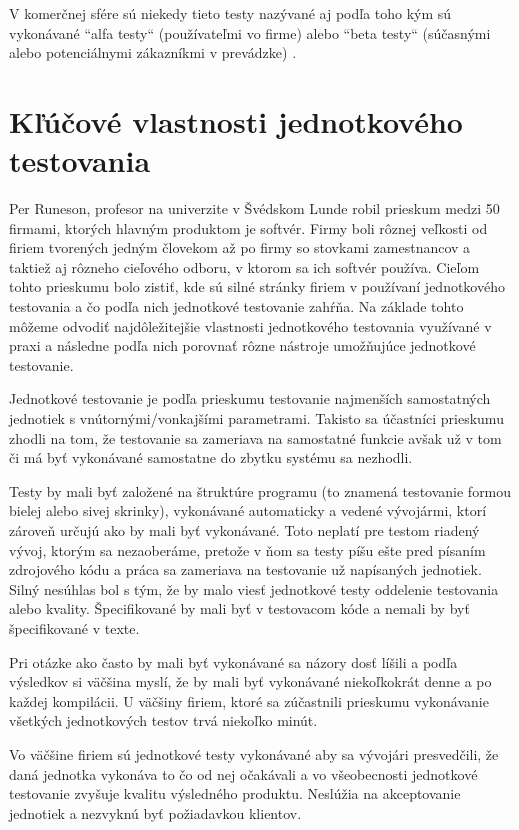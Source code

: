 \documentclass[11pt,twoside,slovak,a4paper]{article}
\begin{document}
			V komerčnej sfére sú niekedy tieto testy nazývané aj podľa toho kým sú vykonávané ``alfa testy`` (používateľmi vo firme) alebo ``beta testy`` (súčasnými alebo potenciálnymi zákazníkmi v prevádzke) \cite{Alba2008}.
	
	\newpage
	\section{Kľúčové vlastnosti jednotkového testovania}
	
	Per Runeson, profesor na univerzite v Švédskom Lunde robil prieskum medzi 50 firmami, ktorých hlavným produktom je softvér\cite{Runeson2006}. Firmy boli rôznej veľkosti od firiem tvorených jedným človekom až po firmy so stovkami zamestnancov a taktiež aj rôzneho cieľového odboru, v ktorom sa ich softvér používa. Cieľom tohto prieskumu bolo zistiť, kde sú silné stránky firiem v používaní jednotkového testovania a čo podľa nich jednotkové testovanie zahŕňa. Na základe tohto môžeme odvodiť najdôležitejšie vlastnosti jednotkového testovania využívané v praxi a následne podľa nich porovnať rôzne nástroje umožňujúce jednotkové testovanie.
	
	Jednotkové testovanie je podľa prieskumu testovanie najmenších samostatných jednotiek s vnútornými/vonkajšími parametrami. Takisto sa účastníci prieskumu zhodli na tom, že testovanie sa zameriava na samostatné funkcie avšak už v tom či má byť vykonávané samostatne do zbytku systému sa nezhodli.
	
	Testy by mali byť založené na štruktúre programu (to znamená testovanie formou bielej alebo sivej skrinky), vykonávané automaticky a vedené vývojármi, ktorí zároveň určujú ako by mali byť vykonávané. Toto neplatí pre testom riadený vývoj, ktorým sa nezaoberáme, pretože v ňom sa testy píšu ešte pred písaním zdrojového kódu a práca sa zameriava na testovanie už napísaných jednotiek. Silný nesúhlas bol s tým, že by malo viesť jednotkové testy oddelenie testovania alebo kvality. Špecifikované by mali byť v testovacom kóde a nemali by byť špecifikované v texte.
	
	Pri otázke ako často by mali byť vykonávané sa názory dosť líšili a podľa výsledkov si väčšina myslí, že by mali byť vykonávané niekoľkokrát denne a po každej kompilácii. U väčšiny firiem, ktoré sa zúčastnili prieskumu vykonávanie všetkých jednotkových testov trvá niekoľko minút.
	
	Vo väčšine firiem sú jednotkové testy vykonávané aby sa vývojári presvedčili, že daná jednotka vykonáva to čo od nej očakávali a vo všeobecnosti jednotkové testovanie zvyšuje kvalitu výsledného produktu. Neslúžia na akceptovanie jednotiek a nezvyknú byť požiadavkou klientov.
	
\end{document}
